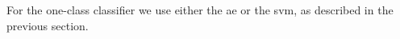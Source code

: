 \documentclass[draftcls,onecolumn,12pt]{IEEEtran}
\begin{document}

For the one-class classifier we use either the \ac{ae} or the \ac{svm}, as described in the previous section. 
%
%
%
% 
%
%    

\end{document}
